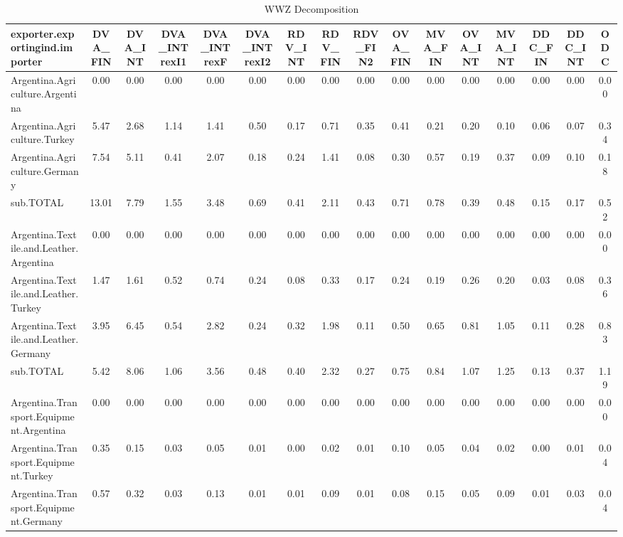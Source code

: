 \documentclass{article}\usepackage[]{graphicx}\usepackage[]{color}
\begin{document}
\begin{landscape}
\begin{table}[htbp]\scriptsize
    \begin{adjustwidth}{-1.15in}{-1.15in}
  \centering
  \caption{WWZ Decomposition}
    \begin{tabular}{lccccccccccccccc}
    \toprule
    exporter.exportingind.importer & DVA\_FIN & DVA\_INT & DVA\_INTrexI1 & DVA\_INTrexF & DVA\_INTrexI2 & RDV\_INT & RDV\_FIN & RDV\_FIN2 & OVA\_FIN & MVA\_FIN & OVA\_INT & MVA\_INT & DDC\_FIN & DDC\_INT & ODC \\
    \midrule
    Argentina.Agriculture.Argentina & 0.00  & 0.00  & 0.00  & 0.00  & 0.00  & 0.00  & 0.00  & 0.00  & 0.00  & 0.00  & 0.00  & 0.00  & 0.00  & 0.00  & 0.00 \\
    Argentina.Agriculture.Turkey & 5.47  & 2.68  & 1.14  & 1.41  & 0.50  & 0.17  & 0.71  & 0.35  & 0.41  & 0.21  & 0.20  & 0.10  & 0.06  & 0.07  & 0.34 \\
    Argentina.Agriculture.Germany & 7.54  & 5.11  & 0.41  & 2.07  & 0.18  & 0.24  & 1.41  & 0.08  & 0.30  & 0.57  & 0.19  & 0.37  & 0.09  & 0.10  & 0.18 \\
    sub.TOTAL & 13.01 & 7.79  & 1.55  & 3.48  & 0.69  & 0.41  & 2.11  & 0.43  & 0.71  & 0.78  & 0.39  & 0.48  & 0.15  & 0.17  & 0.52 \\
    Argentina.Textile.and.Leather.Argentina & 0.00  & 0.00  & 0.00  & 0.00  & 0.00  & 0.00  & 0.00  & 0.00  & 0.00  & 0.00  & 0.00  & 0.00  & 0.00  & 0.00  & 0.00 \\
    Argentina.Textile.and.Leather.Turkey & 1.47  & 1.61  & 0.52  & 0.74  & 0.24  & 0.08  & 0.33  & 0.17  & 0.24  & 0.19  & 0.26  & 0.20  & 0.03  & 0.08  & 0.36 \\
    Argentina.Textile.and.Leather.Germany & 3.95  & 6.45  & 0.54  & 2.82  & 0.24  & 0.32  & 1.98  & 0.11  & 0.50  & 0.65  & 0.81  & 1.05  & 0.11  & 0.28  & 0.83 \\
    sub.TOTAL & 5.42  & 8.06  & 1.06  & 3.56  & 0.48  & 0.40  & 2.32  & 0.27  & 0.75  & 0.84  & 1.07  & 1.25  & 0.13  & 0.37  & 1.19 \\
    Argentina.Transport.Equipment.Argentina & 0.00  & 0.00  & 0.00  & 0.00  & 0.00  & 0.00  & 0.00  & 0.00  & 0.00  & 0.00  & 0.00  & 0.00  & 0.00  & 0.00  & 0.00 \\
    Argentina.Transport.Equipment.Turkey & 0.35  & 0.15  & 0.03  & 0.05  & 0.01  & 0.00  & 0.02  & 0.01  & 0.10  & 0.05  & 0.04  & 0.02  & 0.00  & 0.01  & 0.04 \\
    Argentina.Transport.Equipment.Germany & 0.57  & 0.32  & 0.03  & 0.13  & 0.01  & 0.01  & 0.09  & 0.01  & 0.08  & 0.15  & 0.05  & 0.09  & 0.01  & 0.03  & 0.04 \\

\end{tabular}
\end{adjustwidth}
\end{table}
\end{landscape}
\end{document}
